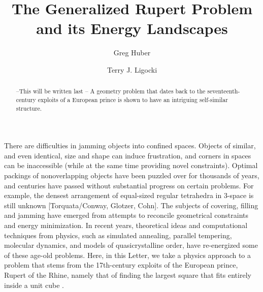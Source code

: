 \documentclass[superscriptaddress,reprint,amsmath,amssymb,aps]{revtex4-1}
\begin{document}

\title{The Generalized Rupert Problem and its Energy Landscapes}


\author{Greg Huber}

\author{Terry J. Ligocki}



\begin{abstract}
--This will be written last --
A geometry problem that dates back to the seventeenth-century exploits
of a European prince is shown to have an intriguing self-similar structure.


\end{abstract}
\maketitle


There are difficulties in jamming objects into confined spaces.  Objects of similar, and even identical, size and shape can induce frustration, and corners in spaces can be inaccessible (while at the same time providing novel constraints).  Optimal packings of nonoverlapping objects have been puzzled over for thousands of years, and centuries have passed without substantial progress on certain problems. For example, the densest arrangement of equal-sized regular tetrahedra in 3-space is still unknown [Torquata/Conway, Glotzer, Cohn]. The subjects of covering, filling and jamming have emerged from attempts to reconcile geometrical constraints and energy minimization. In recent years, theoretical ideas and computational techniques from physics, such as simulated annealing, parallel tempering, molecular dynamics\cite{glotz1,glotz2}, and models of quasicrystalline order\cite{??kohn1}, have re-energized some of these age-old problems. Here, in this Letter, we take a physics approach to a problem that stems from the 17th-century exploits of the European prince, Rupert of the Rhine, namely that of finding the largest square that fits entirely inside a unit cube \cite{rupert-hist1}.
\end{document}
